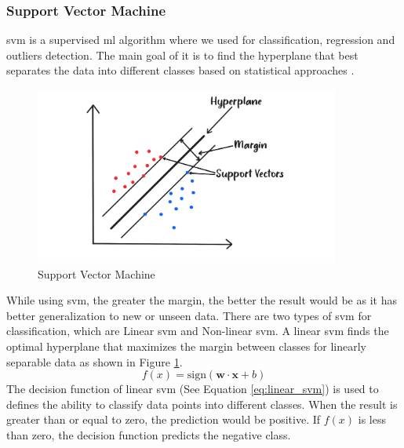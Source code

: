 \subsubsection{Support Vector Machine}
\nocite{berwick_an}
\nocite{_14}
\nocite{saini_2021_support}
\gls{svm} is a supervised \gls{ml} algorithm where we used for classification, regression and outliers detection.
The main goal of it is to find the hyperplane that best separates the data into different classes based on statistical approaches \citep{gron_2019_handson}.
\begin{figure}[H]
    \centering
    \includegraphics[width=10cm]{Images/svm.png}
    \caption{Support Vector Machine}
    \label{fig:svm}
\end{figure}
\newpage
\indent While using \gls{svm}, the greater the margin, the better the result would be as it has better generalization to new or unseen data. 
There are two types of \gls{svm} for classification, which are Linear \gls{svm} and Non-linear \gls{svm}.
A linear \gls{svm} finds the optimal hyperplane that maximizes the margin between classes for linearly separable data as shown in Figure \ref{fig:svm}.
\begin{equation} \label{eq:linear_svm}
    f(x) = \text{sign}(\mathbf{w} \cdot \mathbf{x} + b)
\end{equation}
The decision function of linear \gls{svm} (See Equation \ref{eq:linear_svm}) is used to defines the ability to classify data points into different classes.
When the result is greater than or equal to zero, the prediction would be positive. If $f(x)$ is less than zero, the decision function predicts the negative class. 
